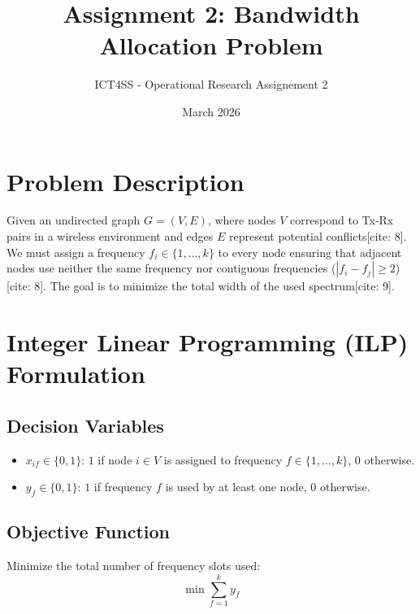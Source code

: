 \documentclass{article}
\title{Assignment 2: Bandwidth Allocation Problem}
\author{ICT4SS - Operational Research Assignement 2}
\date{March 2026}
\begin{document}
\maketitle

\section{Problem Description}
Given an undirected graph $G = (V, E)$, where nodes $V$ correspond to Tx-Rx pairs in a wireless environment and edges $E$ represent potential conflicts[cite: 8]. We must assign a frequency $f_i \in \{1, \dots, k\}$ to every node ensuring that adjacent nodes use neither the same frequency nor contiguous frequencies ($|f_i - f_j| \ge 2$)[cite: 8]. The goal is to minimize the total width of the used spectrum[cite: 9].

\section{Integer Linear Programming (ILP) Formulation}

\subsection{Decision Variables}
\begin{itemize}
    \item $x_{if} \in \{0, 1\}$: $1$ if node $i \in V$ is assigned to frequency $f \in \{1, \dots, k\}$, $0$ otherwise.
    \item $y_f \in \{0, 1\}$: $1$ if frequency $f$ is used by at least one node, $0$ otherwise.
\end{itemize}

\subsection{Objective Function}
Minimize the total number of frequency slots used:
\begin{equation}
    \min \sum_{f=1}^{k} y_f
\end{equation}
\end{document}

